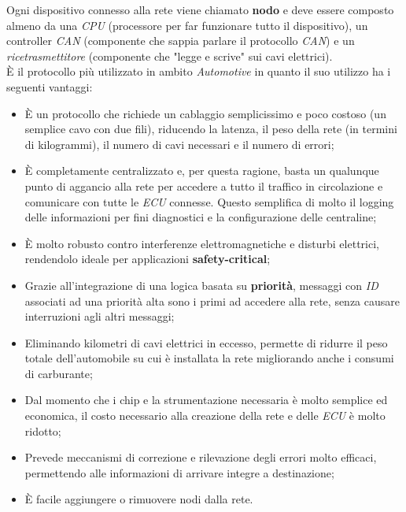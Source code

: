 Ogni dispositivo connesso alla rete viene chiamato \textbf{nodo} e deve essere composto almeno da una \emph{CPU} (processore per far funzionare tutto il dispositivo), un controller \emph{CAN} (componente che sappia parlare il protocollo \emph{CAN}) e un \emph{ricetrasmettitore} (componente che "legge e scrive" sui cavi elettrici).\\
È il protocollo più utilizzato in ambito \emph{Automotive} in quanto il suo utilizzo ha i seguenti vantaggi:

\begin{itemize}
    \item È un protocollo che richiede un cablaggio semplicissimo e poco costoso (un semplice cavo con due fili), riducendo la latenza, il peso della rete (in termini di kilogrammi), il numero di cavi necessari e il numero di errori;
    \item È completamente centralizzato e, per questa ragione, basta un qualunque punto di aggancio alla rete per accedere a tutto il traffico in circolazione e comunicare con tutte le \emph{ECU} connesse. Questo semplifica di molto il logging delle informazioni per fini diagnostici e la configurazione delle centraline;
    \item È molto robusto contro interferenze elettromagnetiche e disturbi elettrici, rendendolo ideale per applicazioni \textbf{safety-critical};
    \item Grazie all'integrazione di una logica basata su \textbf{priorità}, messaggi con \emph{ID} associati ad una priorità alta sono i primi ad accedere alla rete, senza causare interruzioni agli altri messaggi;
    \item Eliminando kilometri di cavi elettrici in eccesso, permette di ridurre il peso totale dell'automobile su cui è installata la rete migliorando anche i consumi di carburante;
    \item Dal momento che i chip e la strumentazione necessaria è molto semplice ed economica, il costo necessario alla creazione della rete e delle \emph{ECU} è molto ridotto;
    \item Prevede meccanismi di correzione e rilevazione degli errori molto efficaci, permettendo alle informazioni di arrivare integre a destinazione;
    \item È facile aggiungere o rimuovere nodi dalla rete. \cite{can_bus_dewesoft}
\end{itemize}

